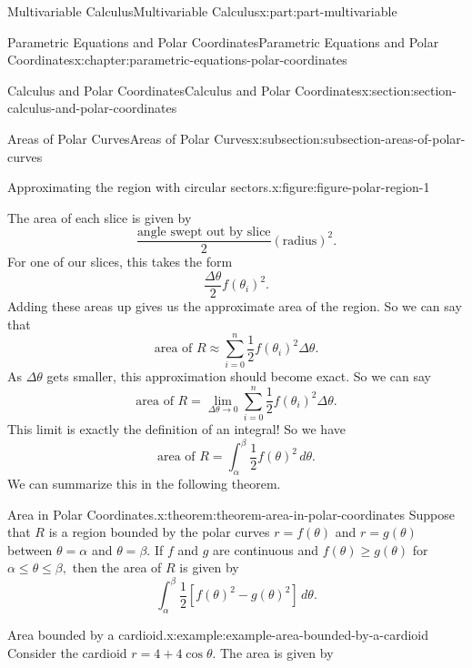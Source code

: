 \documentclass[twoside,10pt,]{book}
\numberwithin{equation}{part}
\begin{document}
\begin{partptx}{Multivariable Calculus}{}{Multivariable Calculus}{}{}{x:part:part-multivariable}
\begin{chapterptx}{Parametric Equations and Polar Coordinates}{}{Parametric Equations and Polar Coordinates}{}{}{x:chapter:parametric-equations-polar-coordinates}
\begin{sectionptx}{Calculus and Polar Coordinates}{}{Calculus and Polar Coordinates}{}{}{x:section:section-calculus-and-polar-coordinates}
\begin{subsectionptx}{Areas of Polar Curves}{}{Areas of Polar Curves}{}{}{x:subsection:subsection-areas-of-polar-curves}
\begin{figureptx}{Approximating the region with circular sectors.}{x:figure:figure-polar-region-1}{}
\begin{image}{0}{1}{0}
{
}%
\end{image}%
\tcblower
\end{figureptx}%
The area of each slice is given by%
%
\begin{equation*}
\frac{\text{angle swept out by slice}}{2}(\text{radius})^{2}.
\end{equation*}
For one of our slices, this takes the form%
%
\begin{equation*}
\frac{\Delta\theta}{2}f(\theta_{i})^{2}.
\end{equation*}
Adding these areas up gives us the approximate area of the region. So we can say that%
%
\begin{equation*}
\text{area of }R \approx \sum_{i=0}^{n}\frac{1}{2}f(\theta_{i})^{2}\Delta\theta.
\end{equation*}
As \(\Delta\theta\) gets smaller, this approximation should become exact. So we can say%
%
\begin{equation*}
\text{area of }R = \lim_{\Delta\theta\to0}\sum_{i=0}^{n}\frac{1}{2}f(\theta_{i})^{2}\Delta\theta.
\end{equation*}
This limit is exactly the definition of an integral! So we have%
%
\begin{equation*}
\text{area of }R = \int_{\alpha}^{\beta}\frac{1}{2}f(\theta)^{2}\,d\theta.
\end{equation*}
We can summarize this in the following theorem.%
\begin{theorem}{Area in Polar Coordinates.}{}{x:theorem:theorem-area-in-polar-coordinates}%
%
Suppose that \(R\) is a region bounded by the polar curves \(r=f(\theta)\) and \(r=g(\theta)\) between \(\theta = \alpha\) and \(\theta=\beta\). If \(f\) and \(g\) are continuous and \(f(\theta)\geq g(\theta)\) for \(\alpha\leq\theta\leq\beta,\) then the area of \(R\) is given by%
\begin{equation*}
\int_{\alpha}^{\beta}\frac{1}{2}[f(\theta)^{2}-g(\theta)^{2}]\,d\theta.
\end{equation*}
%
\end{theorem}
\begin{example}{Area bounded by a cardioid.}{x:example:example-area-bounded-by-a-cardioid}%
Consider the cardioid\footnotemark{} \(r = 4+4\cos\theta\). The area is given by%
%
\begin{equation*}

\end{equation*}
\end{example}
\end{subsectionptx}
\end{sectionptx}
\end{chapterptx}
\end{partptx}
\end{document}

